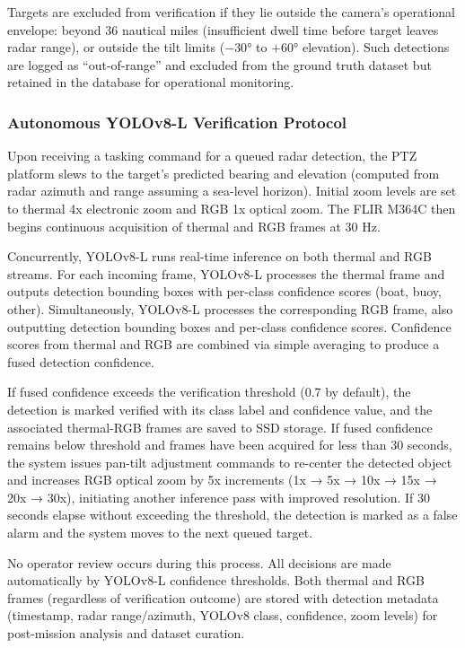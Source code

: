 \documentclass[conf]{asmeconf}
\begin{document}
Targets are excluded from verification if they lie outside the camera's operational envelope: beyond 36 nautical miles (insufficient dwell time before target leaves radar range), or outside the tilt limits ($-30°$ to $+60°$ elevation). Such detections are logged as ``out-of-range'' and excluded from the ground truth dataset but retained in the database for operational monitoring.

\subsubsection{Autonomous YOLOv8-L Verification Protocol}

Upon receiving a tasking command for a queued radar detection, the PTZ platform slews to the target's predicted bearing and elevation (computed from radar azimuth and range assuming a sea-level horizon). Initial zoom levels are set to thermal 4x electronic zoom and RGB 1x optical zoom. The FLIR M364C then begins continuous acquisition of thermal and RGB frames at 30 Hz.

Concurrently, YOLOv8-L runs real-time inference on both thermal and RGB streams. For each incoming frame, YOLOv8-L processes the thermal frame and outputs detection bounding boxes with per-class confidence scores (boat, buoy, other). Simultaneously, YOLOv8-L processes the corresponding RGB frame, also outputting detection bounding boxes and per-class confidence scores. Confidence scores from thermal and RGB are combined via simple averaging to produce a fused detection confidence.

If fused confidence exceeds the verification threshold (0.7 by default), the detection is marked verified with its class label and confidence value, and the associated thermal-RGB frames are saved to SSD storage. If fused confidence remains below threshold and frames have been acquired for less than 30 seconds, the system issues pan-tilt adjustment commands to re-center the detected object and increases RGB optical zoom by 5x increments (1x → 5x → 10x → 15x → 20x → 30x), initiating another inference pass with improved resolution. If 30 seconds elapse without exceeding the threshold, the detection is marked as a false alarm and the system moves to the next queued target.

No operator review occurs during this process. All decisions are made automatically by YOLOv8-L confidence thresholds. Both thermal and RGB frames (regardless of verification outcome) are stored with detection metadata (timestamp, radar range/azimuth, YOLOv8 class, confidence, zoom levels) for post-mission analysis and dataset curation.
\end{document}
